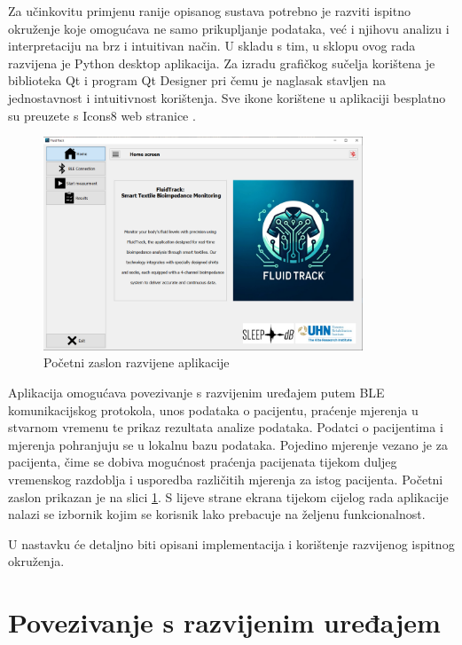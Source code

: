 \documentclass[../diplomski_rad.tex]{subfiles}
\begin{document}
\sloppy

\justifying

Za učinkovitu primjenu ranije opisanog sustava potrebno je 
razviti ispitno okruženje koje omogućava ne samo prikupljanje podataka, 
već i njihovu analizu i interpretaciju na brz i intuitivan način.
U skladu s tim, u sklopu ovog rada razvijena je Python desktop aplikacija. 
Za izradu grafičkog sučelja korištena je biblioteka Qt i program Qt Designer pri čemu je 
naglasak stavljen na jednostavnost i intuitivnost korištenja.
Sve ikone korištene u aplikaciji besplatno su preuzete s Icons8 web stranice \cite{ikone}.

\begin{figure}[htb]
    \centering
    \includegraphics[width=0.85\textwidth]{Figures/home.png} 
    \caption{Početni zaslon razvijene aplikacije}
    \label{slk:home}
\end{figure}

Aplikacija omogućava povezivanje s razvijenim uređajem putem BLE komunikacijskog protokola, 
unos podataka o pacijentu,  
praćenje mjerenja u stvarnom vremenu te prikaz rezultata analize podataka. 
Podatci o pacijentima i mjerenja pohranjuju se u lokalnu bazu podataka. 
Pojedino mjerenje vezano je za pacijenta, čime se dobiva mogućnost praćenja pacijenata 
tijekom duljeg vremenskog razdoblja i usporedba različitih mjerenja za istog pacijenta.
Početni zaslon prikazan je na slici \ref{slk:home}. 
S lijeve strane ekrana tijekom cijelog rada aplikacije nalazi se izbornik kojim se korisnik lako prebacuje 
na željenu funkcionalnost.  

U nastavku će detaljno biti opisani implementacija i korištenje razvijenog ispitnog okruženja.

\section{Povezivanje s razvijenim uređajem}
\end{document}
